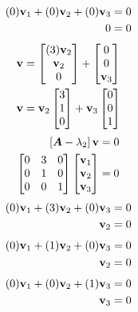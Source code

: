 \documentclass{article}
\begin{document}
\begin{align*}
	(0)\vect{v}_1 + (0)\vect{v}_2 + (0)\vect{v}_3 & = 0 \\
	0 & = 0
\end{align*}
\begin{align*}
	\vect{v} & =
		\begin{bmatrix} (3)\vect{v}_2 \\ \vect{v}_2 \\ 0 \end{bmatrix}
		+ \begin{bmatrix} 0 \\ 0 \\ \vect{v}_3 \end{bmatrix} \\
	\vect{v} & =
		\vect{v}_2 \begin{bmatrix} 3 \\ 1 \\ 0 \end{bmatrix}
		+ \vect{v}_3 \begin{bmatrix} 0 \\ 0 \\ 1 \end{bmatrix}
\end{align*}
\begin{align*}
	\left[ \matr{A} - \lambda_2 \right] \vect{v} & = 0 \\
	\begin{bmatrix}
		0 & 3 & 0 \\
		0 & 1 & 0 \\
		0 & 0 & 1
	\end{bmatrix}
	\begin{bmatrix} \vect{v}_1 \\ \vect{v}_2 \\ \vect{v}_3 \end{bmatrix} & = 0
\end{align*}
\begin{align*}
	(0)\vect{v}_1 + (3)\vect{v}_2 + (0)\vect{v}_3 & = 0 \\
	\vect{v}_2 & = 0
\end{align*}
\begin{align*}
	(0)\vect{v}_1 + (1)\vect{v}_2 + (0)\vect{v}_3 & = 0 \\
	\vect{v}_2 & = 0
\end{align*}
\begin{align*}
	(0)\vect{v}_1 + (0)\vect{v}_2 + (1)\vect{v}_3 & = 0 \\
	\vect{v}_3 & = 0
\end{align*}
\end{document}
